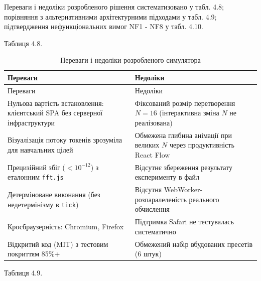 \documentclass[
]{article}
\begin{document}
Переваги і недоліки розробленого рішення систематизовано у табл. 4.8;
порівняння з альтернативними архітектурними підходами у табл. 4.9;
підтвердження нефункціональних вимог NF1 - NF8 у табл. 4.10.

Таблиця 4.8.

\begin{longtable}[]{@{}
  >{\raggedright\arraybackslash}p{}
  >{\raggedright\arraybackslash}p{}@{}}
\caption{Переваги і недоліки розробленого симулятора}\tabularnewline
\toprule\noalign{}
\begin{minipage}[b]{\linewidth}\raggedright
Переваги
\end{minipage} & \begin{minipage}[b]{\linewidth}\raggedright
Недоліки
\end{minipage} \\
\midrule\noalign{}
\endfirsthead
\toprule\noalign{}
\begin{minipage}[b]{\linewidth}\raggedright
Переваги
\end{minipage} & \begin{minipage}[b]{\linewidth}\raggedright
Недоліки
\end{minipage} \\
\midrule\noalign{}
\endhead
\bottomrule\noalign{}
\endlastfoot
Нульова вартість встановлення: клієнтський SPA без серверної
інфраструктури & Фіксований розмір перетворення \(N = 16\) (інтерактивна
зміна \(N\) не реалізована) \\
Візуалізація потоку токенів зрозуміла для навчальних цілей & Обмежена
глибина анімації при великих \(N\) через продуктивність React Flow \\
Прецизійний збіг (\(< 10^{- 12}\)) з еталонним \texttt{fft.js} &
Відсутнє збереження результату експерименту в файл \\
Детерміноване виконання (без недетермінізму в \texttt{tick}) & Відсутня
WebWorker-розпаралеленість реального обчислення \\
Кросбраузерність: Chromium, Firefox & Підтримка Safari не тестувалась
систематично \\
Відкритий код (MIT) з тестовим покриттям 85\%+ & Обмежений набір
вбудованих пресетів (6 штук) \\
\end{longtable}

Таблиця 4.9.
\end{document}

